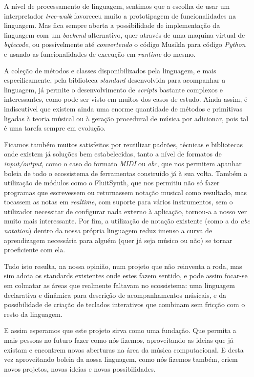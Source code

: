 A nível de processamento de linguagem, sentimos que a escolha de usar um interpretador \textit{tree-walk} favoreceu muito a prototipagem de funcionalidades na linguagem. Mas fica sempre aberta a possibilidade de implementação da linguagem com um \textit{backend} alternativo, quer através de uma maquina virtual de \textit{bytecode}, ou possivelmente até \textit{convertendo} o código Musikla para código \textit{Python} e usando as funcionalidades de execução em \textit{runtime} do mesmo.

A coleção de métodos e classes disponibilizados pela linguagem, e mais especificamente, pela biblioteca \textit{standard} desenvolvida para acompanhar a linguagem, já permite o desenvolvimento de \textit{scripts} bastante complexos e interessantes, como pode ser visto em muitos dos casos de estudo. Ainda assim, é indiscutível que existem ainda uma enorme quantidade de métodos e primitivas ligadas à teoria músical ou à geração procedural de música por adicionar, pois tal é uma tarefa sempre em evolução.

Ficamos também muitos satisfeitos por reutilizar padrões, técnicas e bibliotecas onde existem já soluções bem estabelecidas, tanto a nível de formatos de \textit{input/output}, como o caso do formato \textit{MIDI} ou \textit{abc}, que nos permitem apanhar boleia de todo o ecossistema de ferramentas construído já à sua volta. Também a utilização de módulos como o FluitSynth, que nos permitiu não só fazer programas que escrevessem ou returnassem notação musical como resultado, mas tocassem as notas em \textit{realtime}, com suporte para vários instrumentos, sem o utilizador necessitar de configurar nada externo à aplicação, tornou-a a nosso ver muito mais interessante. Por fim, a utilização de notação existente (como a do \textit{abc notation}) dentro da nossa própria linguagem reduz imenso a curva de aprendizagem necessária para alguém (quer já seja músico ou não) se tornar proeficiente com ela.

Tudo isto resulta, na nossa opinião, num projeto que não reinventa a roda, mas sim adota os standards existentes onde estes fazem sentido, e pode assim focar-se em colmatar as áreas que realmente faltavam no ecossistema: uma linguagem declarativa e dinâmica para descrição de acompanhamentos músicais, e da possibilidade de criação de teclados interativos que combinam sem fricção com o resto da linguagem. 

E assim esperamos que este projeto sirva como uma fundação. Que permita a mais pessoas no futuro fazer como nós fizemos, aproveitando as ideias que já existam e encontrem novas aberturas na área da música computacional. E desta vez aproveitando boleia da nossa linguagem, como nós fizemos também, criem novos projetos, novas ideias e novas possibilidades.
